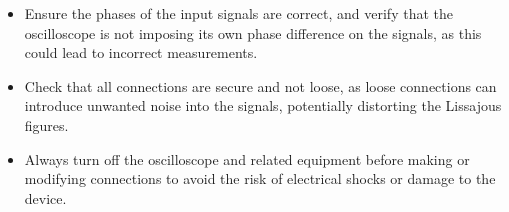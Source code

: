\documentclass[a4paper,12pt]{article}
\numberwithin{equation}{section} %
\begin{document}
\begin{itemize}
    \item Ensure the phases of the input signals are correct, and verify that the oscilloscope is not imposing its own phase difference on the signals, as this could lead to incorrect measurements.
    \item Check that all connections are secure and not loose, as loose connections can introduce unwanted noise into the signals, potentially distorting the Lissajous figures.
    \item Always turn off the oscilloscope and related equipment before making or modifying connections to avoid the risk of electrical shocks or damage to the device.
\end{itemize}
\end{document}
